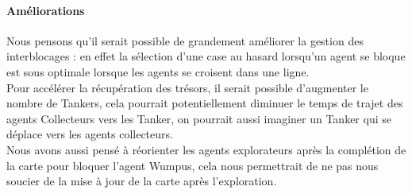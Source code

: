 \documentclass[10pt]{article}
\newcommand\tab[1][0.65cm]{\hspace*{#1}}
\begin{document}
\paragraph{Améliorations}  
Nous pensons qu'il serait possible de grandement améliorer la gestion des interblocages : en effet la sélection d'une case au hasard lorsqu'un agent se bloque est sous optimale lorsque les agents se croisent dans une ligne.\\
\tab Pour accélérer la récupération des trésors, il serait possible d'augmenter le nombre de Tankers, cela pourrait potentiellement diminuer le temps de trajet des agents Collecteurs vers les Tanker, on pourrait aussi imaginer un Tanker qui se déplace vers les agents collecteurs.\\
\tab Nous avons aussi pensé à réorienter les agents explorateurs après la complétion de la carte pour bloquer l'agent Wumpus, cela nous permettrait de ne pas nous soucier de la mise à jour de la carte après l'exploration.\\ 


	
\end{document}
